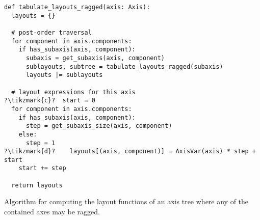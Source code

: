 \documentclass[thesis]{subfiles}
\begin{document}
\begin{algorithm}
  \begin{verbatim}
def tabulate_layouts_ragged(axis: Axis):
  layouts = {}

  # post-order traversal
  for component in axis.components:
    if has_subaxis(axis, component): 
      subaxis = get_subaxis(axis, component)
      sublayouts, subtree = tabulate_layouts_ragged(subaxis)
      layouts |= sublayouts

  # layout expressions for this axis
?\tikzmark{c}?  start = 0
  for component in axis.components:
    if has_subaxis(axis, component):
      step = get_subaxis_size(axis, component)
    else:
      step = 1
?\tikzmark{d}?    layouts[(axis, component)] = AxisVar(axis) * step + start
    start += step

  return layouts
  \end{verbatim}

  \caption{
    Algorithm for computing the layout functions of an axis tree where any of the contained axes may be ragged.
  }
  \label{alg:tabulate_layouts_ragged}
\end{algorithm}
\end{document}

